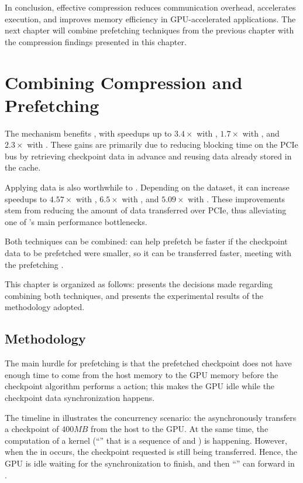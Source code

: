 \documentclass[Ingles,Final]{ic-tese-v3}
\begin{document}
In conclusion, effective compression reduces communication overhead, accelerates execution, and improves memory efficiency in GPU-accelerated applications. The next chapter will combine prefetching techniques from the previous chapter with the compression findings presented in this chapter.


\chapter{Combining Compression and Prefetching}
\label{ch:comppref}

The \checkpointprefetching mechanism benefits \awave, with speedups up to $3.4\times$ with \revolve, $1.7\times$ with \zcut, and $2.3\times$ with \uniform. These gains are primarily due to reducing blocking time on the PCIe bus by retrieving checkpoint data in advance and reusing data already stored in the cache.

Applying \checkpointing data \compression is also worthwhile to \awave. Depending on the dataset, it can increase speedups to $4.57\times$ with \revolve, $6.5\times$ with \zcut, and $5.09\times$ with \uniform. These improvements stem from reducing the amount of data transferred over PCIe, thus alleviating one of \awave's main performance bottlenecks.

Both techniques can be combined: \compression can help prefetch be faster if the checkpoint data to be prefetched were smaller, so it can be transferred faster, meeting with the prefetching .

This chapter is organized as follows:  presents the decisions made regarding combining both techniques, and  presents the experimental results of the methodology adopted.

\section{Methodology}
\label{sec:comppref_methodology}

The main hurdle for prefetching is that the prefetched checkpoint does not have enough time to come from the host memory to the GPU memory before the checkpoint algorithm performs a \restore action; this makes the GPU idle while the checkpoint data synchronization happens.

The timeline  in  illustrates the concurrency scenario: the   asynchronously transfers a checkpoint of $400MB$ from the host to the GPU. At the same time, the computation of a kernel (``'' that is a sequence of \fwd and \bwd) is happening. However, when the \restore in  occurs, the checkpoint requested is still being transferred. Hence, the GPU is idle waiting for the synchronization to finish, and then ``'' can forward in .
\end{document}
